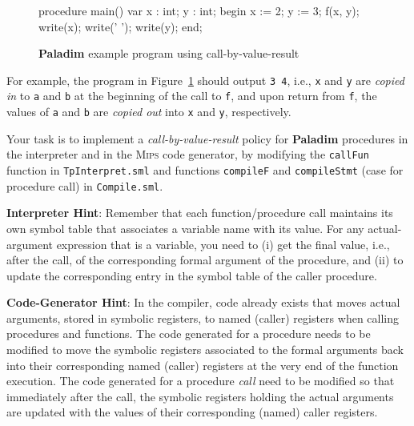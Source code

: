 \documentclass[12pt,a4paper]{article}
\newcommand{\paladim}{\textbf{Paladim}\xspace}
\newcommand{\mips}{\textsc{Mips}\xspace}
\begin{document}
{\begin{figure}
\begin{code}[frame=lines,fontsize=\scriptsize,label=\textit{DATA/proctest.pal}]
procedure main()
var x : int; y : int;
begin
   x := 2; y := 3;
   f(x, y);
   write(x); write(' '); write(y);
end;
\end{code}
\vspace*{-4ex}
\caption{\paladim example program using call-by-value-result}
\label{fig:proctest}
\end{figure}

For example, the program in Figure~\ref{fig:proctest} should output \texttt{3 4}, i.e.,
\texttt{x} and \texttt{y} are \emph{copied in} to \texttt{a} and \texttt{b} at
the beginning of the call to \texttt{f}, and upon return from \texttt{f}, the
values of \texttt{a} and \texttt{b} are \emph{copied out} into \texttt{x} and
\texttt{y}, respectively.

Your task is to implement a \emph{call-by-value-result} policy for \paladim
procedures in the interpreter and in the \mips code generator, by modifying
the \texttt{callFun} function in 
\texttt{TpInterpret.sml} and functions \texttt{compileF} and
\texttt{compileStmt} (case for procedure call) in \texttt{Compile.sml}.

\smallskip
\textbf{Interpreter Hint}:
Remember that each function/procedure call maintains its own symbol table 
that associates a variable name with its value. 
For any actual-argument expression that is a variable, you need to 
(i) get the final value, i.e., after the call, of the corresponding formal 
argument of the procedure, and 
(ii) to update the corresponding entry in the symbol table of the caller procedure.


\smallskip
\textbf{Code-Generator Hint}: 
In the compiler, code already exists that moves actual arguments, stored in 
symbolic registers, to named (caller) registers when calling procedures and functions.  
The code generated for a procedure needs to be modified to move the symbolic 
registers associated to the formal arguments back into their corresponding 
named (caller) registers at the very end of the function execution. 
The code generated for a procedure
{\em call} need to be modified so that immediately after the call, the
symbolic registers holding the actual arguments are updated with the
values of their corresponding (named) caller registers.




}
\end{document}
